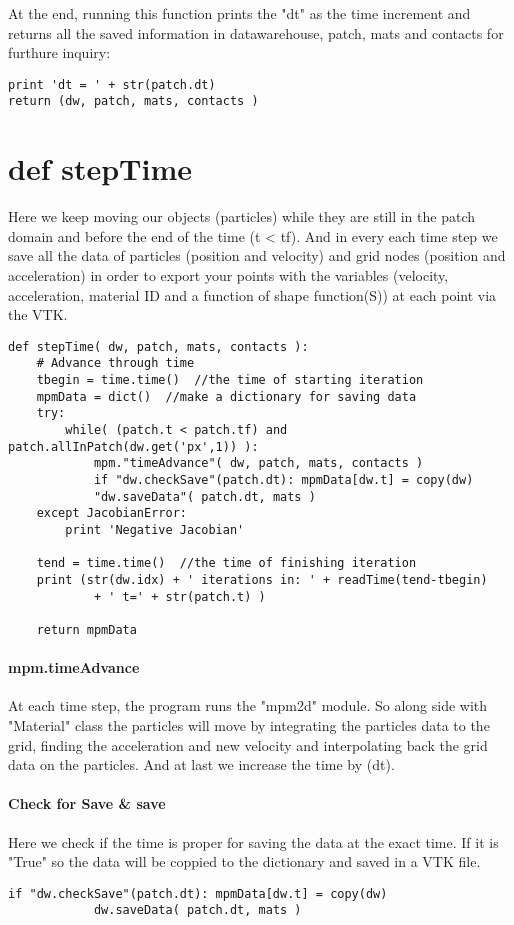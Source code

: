 \documentclass[11pt,fleqn]{book} %
\begin{document}
At the end, running this function prints the "dt" as the time increment and returns all the saved information in datawarehouse, patch, mats and contacts for furthure inquiry:
\begin{lstlisting}
print 'dt = ' + str(patch.dt)        
return (dw, patch, mats, contacts )
\end{lstlisting}


\section{def stepTime}
Here we keep moving our objects (particles) while they are still in the patch domain and before the end of the time (t < tf). And in every each time step we save all the data of particles (position and velocity) and grid nodes (position and acceleration) in order to export your points with the variables (velocity, acceleration, material ID and a function of shape function(S)) at each point via the VTK.
\begin{lstlisting}
def stepTime( dw, patch, mats, contacts ):
    # Advance through time
    tbegin = time.time()  //the time of starting iteration
    mpmData = dict()  //make a dictionary for saving data
    try:
        while( (patch.t < patch.tf) and patch.allInPatch(dw.get('px',1)) ):
            mpm."timeAdvance"( dw, patch, mats, contacts )
            if "dw.checkSave"(patch.dt): mpmData[dw.t] = copy(dw)
            "dw.saveData"( patch.dt, mats )
    except JacobianError:
        print 'Negative Jacobian'
            
    tend = time.time()  //the time of finishing iteration 
    print (str(dw.idx) + ' iterations in: ' + readTime(tend-tbegin) 
            + ' t=' + str(patch.t) )
            
    return mpmData
\end{lstlisting}
\paragraph{mpm.timeAdvance}
At each time step, the program runs the "mpm2d" module. So along side with "Material" class the particles will move by integrating the particles data to the grid, finding the acceleration and new velocity and interpolating back the grid data on the particles. And at last we increase the time by (dt).
\paragraph{Check for Save \& save}
Here we check if the time is proper for saving the data at the exact time. If it is "True" so the data will be coppied to the  dictionary and saved in a VTK file.
\begin{lstlisting}
if "dw.checkSave"(patch.dt): mpmData[dw.t] = copy(dw)
            dw.saveData( patch.dt, mats )
\end{lstlisting}
\end{document}

